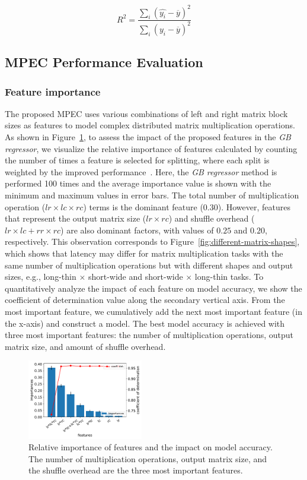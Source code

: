 \documentclass[10pt, conference, compsocconf]{IEEEtran}
\begin{document}
\begin{equation}\label{eq:cod}
  R^2 = \frac{\sum\limits_{i} (\hat{y_i}-\overline{y})^2}{\sum\limits_{i} (y_i-\overline{y})^2}
\end{equation}


\subsection{MPEC Performance Evaluation}
\subsubsection{Feature importance} The proposed MPEC uses various combinations of left and right matrix block sizes as features to model complex distributed matrix multiplication operations. As shown in Figure~\ref{fig:feature-importance}, to assess the impact of the proposed features in the \textit{GB regressor}, we visualize the relative importance of features calculated by counting the number of times a feature is selected for splitting, where each split is weighted by the improved performance~\cite{gb-feature-importance}. Here, the \textit{GB regressor} method is performed 100 times and the average importance value is shown with the minimum and maximum values in error bars. The total number of multiplication operation ($lr \times lc \times rc$) terms is the dominant feature (0.30). However, features that represent the output matrix size ($lr \times rc$) and shuffle overhead ($lr \times lc + rr \times rc$) are also dominant factors, with values of $0.25$ and $0.20$, respectively. This observation corresponds to Figure~\ref{fig:different-matrix-shapes}, which shows that latency may differ for matrix multiplication tasks with the same number of multiplication operations but with different shapes and output sizes, e.g., long-thin $\times$ short-wide and short-wide $\times$ long-thin tasks. To quantitatively analyze the impact of each feature on model accuracy, we show the coefficient of determination value along the secondary vertical axis. From the most important feature, we cumulatively add the next most important feature (in the x-axis) and construct a model. The best model accuracy is achieved with three most important features: the number of multiplication operations, output matrix size, and amount of shuffle overhead.

\begin{figure}
  \centering\includegraphics[width=0.45\textwidth]{figures/feature-importance.pdf}\caption{Relative importance of features and the impact on model accuracy. The number of multiplication operations, output matrix size, and  the shuffle overhead are the three most important features.}\label{fig:feature-importance}
\end{figure}
\end{document}
